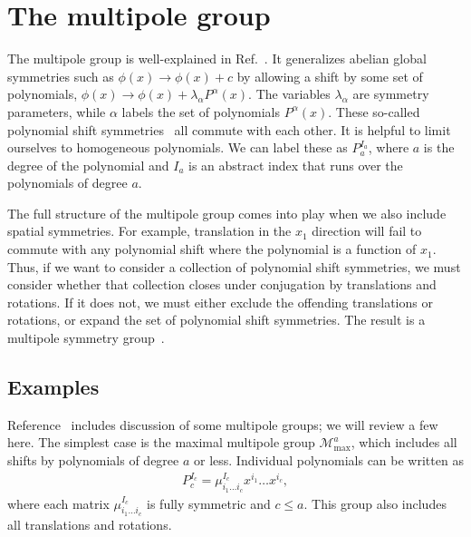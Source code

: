 \documentclass[pra,aps,twocolumn, amsfonts,amsmath,amssymb,nofootinbib,superscriptaddress]{revtex4}
\newcommand{\goesto}{\rightarrow}
\begin{document}
\section{The multipole group}
\label{multipolegroup}

The multipole group is well-explained in Ref.~\cite{Gromov2019}. It generalizes abelian global symmetries such as $\phi(x) \goesto\phi (x) +c$ by allowing a shift by some set of polynomials, $\phi (x) \goesto \phi (x) + \lambda_\alpha P^\alpha(x)$. The variables $\lambda_\alpha$ are symmetry parameters, while $\alpha$ labels the set of polynomials $P^\alpha(x)$. These so-called polynomial shift symmetries~\cite{Griffin2015} all commute with each other. It is helpful to limit ourselves to homogeneous polynomials. We can label these as $P_a^{I_a}$, where $a$ is the degree of the polynomial and $I_a$ is an abstract index that runs over the polynomials of degree $a$.

The full structure of the multipole group comes into play when we also include spatial symmetries. For example,  translation in the $x_1$ direction will fail to commute with any polynomial shift where the polynomial is a function of $x_1$. Thus, if we want to consider a collection of polynomial shift symmetries, we must consider whether that collection closes under conjugation by translations and rotations. If it does not, we must either exclude the offending translations or rotations, or expand the set of polynomial shift symmetries. The result is a multipole symmetry group~\cite{Gromov2019}.

\subsection{Examples} \label{sub:examples}

Reference~\cite{Gromov2019} includes discussion of some multipole groups; we will review a few here. The simplest case is the maximal multipole group $\mathcal{M}^a_\text{max}$, which includes all shifts by polynomials of degree $a$ or less. Individual polynomials can be written as
\begin{align}
P_c^{I_c} = \mu^{I_c}_{i_1\dots i_c}x^{i_1}\dots x^{i_c}, \label{eqn:basis}
\end{align}
where each  matrix  $\mu^{I_c}_{i_1\dots i_c}$ is fully symmetric and $c\le a$. This group also includes all translations and rotations.
\end{document}
